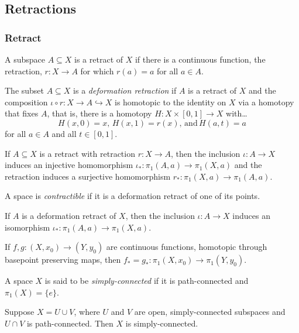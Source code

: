 \subsection{Retractions}

\subsubsection{Retract}\label{retract}
A subspace $A \subseteq X$ is a retract of $X$ if there is a continuous function, the retraction,
$r : X \rightarrow A$ for which $r(a) = a$ for all $a \in A$.

\label{deformationretract}
The subset $A \subseteq X$ is a \emph{deformation retraction} if $A$ is a retract of $X$ and the composition
$\iota \circ r : X \rightarrow A \hookrightarrow X$ is homotopic to the identity on $X$ via a homotopy that fixes $A$,
that is, there is a homotopy $H : X \times [0,1] \rightarrow X$ with\dots
$$H(x,0) = x, \, H(x,1) = r(x), \, \textrm{and} \, H(a,t) = a$$
for all $a \in A$ and all $t \in [0,1]$.

\begin{proposition}
If $A \subseteq X$ is a retract with retraction $r : X \rightarrow A$, then the inclusion $\iota : A \rightarrow X$ induces
an injective homomorphism $\iota_* : \pi_1(A,a) \rightarrow \pi_1(X,a)$ and the retraction induces a surjective homomorphism
$r_* : \pi_1(X,a) \rightarrow \pi_1(A,a)$.
\end{proposition}

\label{contractible}
A space is \emph{contractible} if it is a deformation retract of one of its points.

\begin{theorem}
If $A$ is a deformation retract of $X$, then the inclusion $\iota : A \rightarrow X$ induces an isomorphism
$\iota_{*} : \pi_1(A, a) \rightarrow \pi_1(X, a)$.
\end{theorem}

\begin{lemma}
If $f,g:(X,x_0) \rightarrow (Y,y_0)$ are continuous functions, homotopic through basepoint preserving maps, then $f_* = g_* : \pi_1(X,x_0) \rightarrow \pi_1(Y,y_0)$.
\end{lemma}

\label{simplyconnected}
A space $X$ is said to be \emph{simply-connected} if it is path-connected and $\pi_1(X) = \{ e \}$.

\begin{theorem}
Suppose $X = U \cup V$, where $U$ and $V$ are open, simply-connected subspaces and $U \cap V$ is path-connected.
Then $X$ is simply-connected.
\end{theorem}

